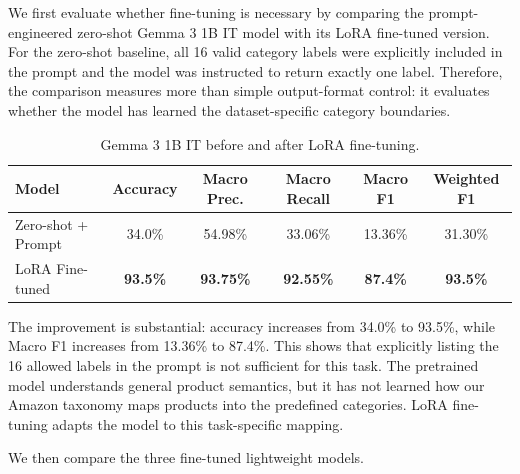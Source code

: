 \documentclass{article}
\begin{document}
We first evaluate whether fine-tuning is necessary by comparing the
prompt-engineered zero-shot Gemma 3 1B IT model with its LoRA fine-tuned
version. For the zero-shot baseline, all 16 valid category labels were
explicitly included in the prompt and the model was instructed to return
exactly one label. Therefore, the comparison measures more than simple
output-format control: it evaluates whether the model has learned the
dataset-specific category boundaries.

\begin{table}[h]
\centering
\caption{Gemma 3 1B IT before and after LoRA fine-tuning.}
\label{tab:zero-ft}
\small
\begin{tabular}{lccccc}
\toprule
Model &
Accuracy &
Macro Prec. &
Macro Recall &
Macro F1 &
Weighted F1 \\
\midrule
Zero-shot + Prompt
& 34.0\%
& 54.98\%
& 33.06\%
& 13.36\%
& 31.30\% \\

LoRA Fine-tuned
& \textbf{93.5\%}
& \textbf{93.75\%}
& \textbf{92.55\%}
& \textbf{87.4\%}
& \textbf{93.5\%} \\
\bottomrule
\end{tabular}
\end{table}

The improvement is substantial: accuracy increases from 34.0\% to 93.5\%,
while Macro F1 increases from 13.36\% to 87.4\%. This shows that explicitly
listing the 16 allowed labels in the prompt is not sufficient for this task.
The pretrained model understands general product semantics, but it has not
learned how our Amazon taxonomy maps products into the predefined categories.
LoRA fine-tuning adapts the model to this task-specific mapping.

We then compare the three fine-tuned lightweight models.

\begin{table}[h]
\centering
\caption{Comparison of fine-tuned lightweight language models.}
\label{tab:model-results}
\small
{}
\end{table}
\end{document}
